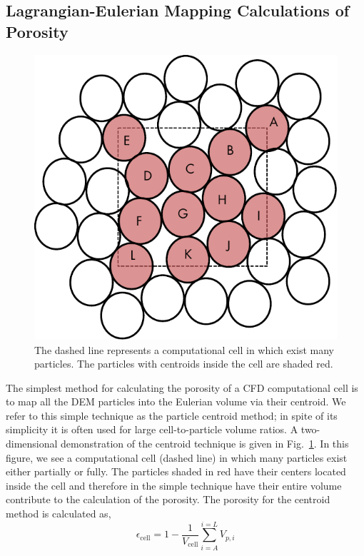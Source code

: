 \subsection{Lagrangian-Eulerian Mapping Calculations of Porosity}\label{sec:lag-eul-mapping}
\begin{figure}[t]
	\centering
	\includegraphics[width=\singleimagewidth]{figures/void-fraction-cell.pdf}
	\caption{The dashed line represents a computational cell in which exist many particles. The particles with centroids inside the cell are shaded red.}\label{fig:centroid-void-fraction}
\end{figure}
The simplest method for calculating the porosity of a CFD computational cell is to map all the DEM particles into the Eulerian volume via their centroid. We refer to this simple technique as the particle centroid method; in spite of its simplicity it is often used for large cell-to-particle volume ratios.\cite{Xu1997} A two-dimensional demonstration of the centroid technique is given in Fig.~\ref{fig:centroid-void-fraction}. In this figure, we see a computational cell (dashed line) in which many particles exist either partially or fully. The particles shaded in red have their centers located inside the cell and therefore in the simple technique have their entire volume contribute to the calculation of the porosity. The porosity for the centroid method is calculated as,
\begin{equation}
	\epsilon_\text{cell} = 1-\frac{1}{V_\text{cell}}\sum_{i = A}^{i=L}V_{p,i}
\end{equation}
